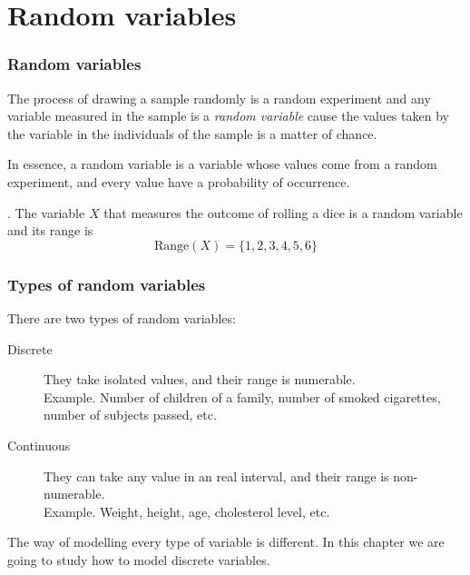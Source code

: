 \section{Random variables}



\begin{frame}
\frametitle{Random variables}
The process of drawing a sample randomly is a random experiment and any variable measured in the sample is a
\emph{random variable} cause the values taken by the variable in the individuals of the sample is a matter of chance.


In essence, a random variable is a variable whose values come from a random experiment, and every value have
a probability of occurrence. 

. The variable $X$ that measures the outcome of rolling a dice is a random variable and its
range is 
\[
\mbox{Range}(X)=\{1,2,3,4,5,6\}
\]
\end{frame}


\begin{frame}
\frametitle{Types of random variables}
There are two types of random variables:
\begin{description}
\item[Discrete] They take isolated values, and their range is numerable.\\
Example. Number of children of a family, number of smoked cigarettes, number of subjects passed, etc.
\item[Continuous] They can take any value in an real interval, and their range is non-numerable.\\
Example. Weight, height, age, cholesterol level, etc. 
\end{description}

The way of modelling every type of variable is different. 
In this chapter we are going to study how to model discrete variables.
\end{frame}


